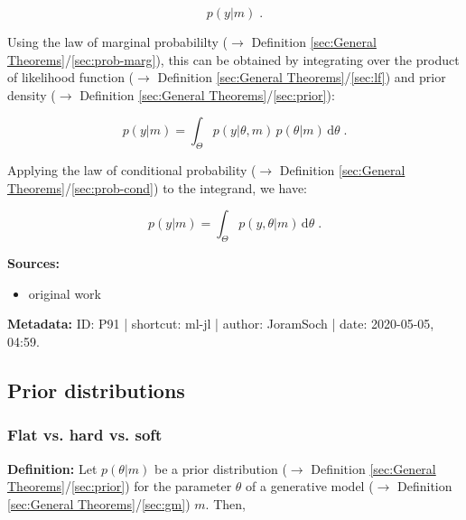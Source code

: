 \documentclass[a4paper,12pt,twoside]{book}
\begin{document}
\begin{equation} \label{eq:ml-jl-ml-def}
p(y|m) \; .
\end{equation}

Using the law of marginal probabililty ($\rightarrow$ Definition \ref{sec:General Theorems}/\ref{sec:prob-marg}), this can be obtained by integrating over the product of likelihood function ($\rightarrow$ Definition \ref{sec:General Theorems}/\ref{sec:lf}) and prior density ($\rightarrow$ Definition \ref{sec:General Theorems}/\ref{sec:prior}):

\begin{equation} \label{eq:ml-jl-ml-int}
p(y|m) = \int_{\Theta} p(y|\theta,m) \, p(\theta|m) \, \mathrm{d}\theta \; .
\end{equation}

Applying the law of conditional probability ($\rightarrow$ Definition \ref{sec:General Theorems}/\ref{sec:prob-cond}) to the integrand, we have:

\begin{equation} \label{eq:ml-jl-ml-qed}
p(y|m) = \int_{\Theta} p(y,\theta|m) \, \mathrm{d}\theta \; .
\end{equation}


\vspace{1em}
\textbf{Sources:}
\begin{itemize}
\item original work\end{itemize}


\vspace{1em}
\textbf{Metadata:} ID: P91 | shortcut: ml-jl | author: JoramSoch | date: 2020-05-05, 04:59.
\vspace{1em}



\subsection{Prior distributions}

\subsubsection[\textit{Flat vs. hard vs. soft}]{Flat vs. hard vs. soft} \label{sec:prior-flat}
\setcounter{equation}{0}

\textbf{Definition:} Let $p(\theta \vert m)$ be a prior distribution ($\rightarrow$ Definition \ref{sec:General Theorems}/\ref{sec:prior}) for the parameter $\theta$ of a generative model ($\rightarrow$ Definition \ref{sec:General Theorems}/\ref{sec:gm}) $m$. Then,
\end{document}
